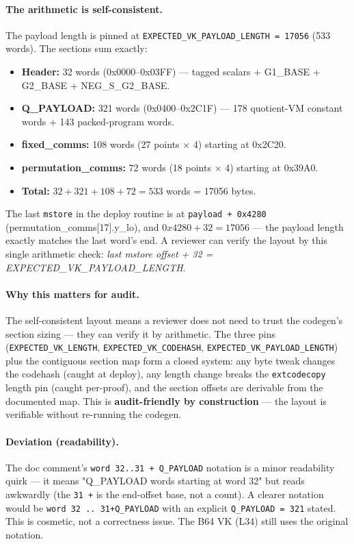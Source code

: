 \paragraph{The arithmetic is self-consistent.} The payload length
is pinned at \texttt{EXPECTED\_\allowbreak{}VK\_\allowbreak{}PAYLOAD\_\allowbreak{}LENGTH = 17056}
(533 words). The sections sum exactly:
\begin{itemize}
\item \textbf{Header:} 32 words (0x0000--0x03FF) --- tagged
  scalars + G1\_BASE + G2\_BASE + NEG\_S\_G2\_BASE.
\item \textbf{Q\_PAYLOAD:} 321 words (0x0400--0x2C1F) --- 178
  quotient-VM constant words + 143 packed-program words.
\item \textbf{fixed\_comms:} 108 words (27 points $\times$ 4)
  starting at 0x2C20.
\item \textbf{permutation\_comms:} 72 words (18 points $\times$
  4) starting at 0x39A0.
\item \textbf{Total:} $32 + 321 + 108 + 72 = 533$ words =
  17056 bytes.
\end{itemize}
The last \texttt{mstore} in the deploy routine is at
\texttt{payload + 0x4280} (permutation\_comms[17].y\_lo), and
$0x4280 + 32 = 17056$ --- the payload length exactly matches the
last word's end. A reviewer can verify the layout by this single
arithmetic check: \emph{last mstore offset + 32 =
EXPECTED\_VK\_PAYLOAD\_LENGTH}.

\paragraph{Why this matters for audit.} The self-consistent layout
means a reviewer does not need to trust the codegen's section
sizing --- they can verify it by arithmetic. The three pins
(\texttt{EXPECTED\_\allowbreak{}VK\_\allowbreak{}LENGTH}, \texttt{EXPECTED\_\allowbreak{}VK\_\allowbreak{}CODEHASH},
\texttt{EXPECTED\_\allowbreak{}VK\_\allowbreak{}PAYLOAD\_\allowbreak{}LENGTH}) plus the contiguous
section map form a closed system: any byte tweak changes the
codehash (caught at deploy), any length change breaks the
\texttt{extcodecopy} length pin (caught per-proof), and the
section offsets are derivable from the documented map. This is
\textbf{audit-friendly by construction} --- the layout is
verifiable without re-running the codegen.

\paragraph{Deviation (readability).} The doc comment's
\texttt{word 32..31 + Q\_\allowbreak{}PAYLOAD} notation is a minor readability
quirk --- it means "Q\_PAYLOAD words starting at word 32" but
reads awkwardly (the \texttt{31 +} is the end-offset base, not a
count). A clearer notation would be
\texttt{word 32 .. 31+Q\_\allowbreak{}PAYLOAD} with an explicit
\texttt{Q\_PAYLOAD = 321} stated. This is cosmetic, not a
correctness issue.  The B64 VK (L34) still uses the
original notation.

